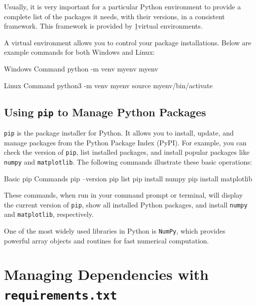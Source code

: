 Usually, it is very important for a particular Python environment to provide a complete list of the packages it needs, with their versions, in a consistent framework. This framework is provided by \b1{virtual environments}.

A virtual environment allows you to control your package installations. Below are example commands for both Windows and Linux:

\begin{codeonly}{Windows Command}
python -m venv myenv
myenv\Scripts\activate
\end{codeonly}

\begin{codeonly}{Linux Command}
python3 -m venv myenv
source myenv/bin/activate
\end{codeonly}

\subsection{Using \texttt{pip} to Manage Python Packages}

\noindent \texttt{pip} is the package installer for Python. It allows you to install, update, and manage packages from the Python Package Index (PyPI). For example, you can check the version of \texttt{pip}, list installed packages, and install popular packages like \texttt{numpy} and \texttt{matplotlib}. The following commands illustrate these basic operations:

\begin{codeonly}{Basic pip Commands}
pip --version
pip list
pip install numpy
pip install matplotlib
\end{codeonly}

\noindent These commands, when run in your command prompt or terminal, will display the current version of \texttt{pip}, show all installed Python packages, and install \texttt{numpy} and \texttt{matplotlib}, respectively.

One of the most widely used libraries in Python is \texttt{NumPy}, which provides powerful array objects and routines for fast numerical computation. 


%
\section{Managing Dependencies with \texttt{requirements.txt}}

